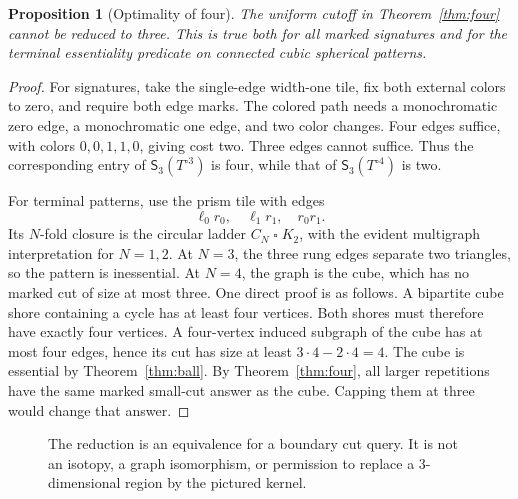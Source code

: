 \documentclass[11pt]{article}
\newtheorem{proposition}[theorem]{Proposition}
\theoremstyle{remark}\newtheorem{remark}[theorem]{Remark}
\newcommand{\Sig}{\mathsf S}
\begin{document}
\begin{proposition}[Optimality of four]
\label{prop:sharp}
The uniform cutoff in Theorem~\ref{thm:four} cannot be reduced to three. This is true both for all marked signatures and for the terminal essentiality predicate on connected cubic spherical patterns.
\end{proposition}
\begin{proof}
For signatures, take the single-edge width-one tile, fix both external colors to zero, and require both edge marks. The colored path needs a monochromatic zero edge, a monochromatic one edge, and two color changes. Four edges suffice, with colors $0,0,1,1,0$, giving cost two. Three edges cannot suffice. Thus the corresponding entry of $\Sig_3(T^{\circ3})$ is four, while that of $\Sig_3(T^{\circ4})$ is two.

For terminal patterns, use the prism tile with edges
\[
 \ell_0r_0,\quad\ell_1r_1,\quad r_0r_1.
\]
Its $N$-fold closure is the circular ladder $C_N\mathbin{\square}K_2$, with the evident multigraph interpretation for $N=1,2$. At $N=3$, the three rung edges separate two triangles, so the pattern is inessential. At $N=4$, the graph is the cube, which has no marked cut of size at most three. One direct proof is as follows. A bipartite cube shore containing a cycle has at least four vertices. Both shores must therefore have exactly four vertices. A four-vertex induced subgraph of the cube has at most four edges, hence its cut has size at least $3\cdot4-2\cdot4=4$. The cube is essential by Theorem~\ref{thm:ball}. By Theorem~\ref{thm:four}, all larger repetitions have the same marked small-cut answer as the cube. Capping them at three would change that answer.
\end{proof}

\begin{figure}[ht]
\centering
{}
\caption{The reduction is an equivalence for a boundary cut query. It is not an isotopy, a graph isomorphism, or permission to replace a 3-dimensional region by the pictured kernel.}
\end{figure}
\end{document}
